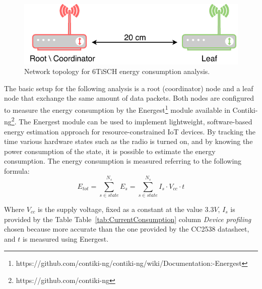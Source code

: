 \documentclass[conference]{IEEEtran}
\newcommand{\tabref}[1]{Table~\ref{#1}}
\renewcommand\_{\textunderscore\allowbreak}
\begin{document}
\begin{figure}[htbp]
	\centering
	\includegraphics[width=.35\textwidth,keepaspectratio]{figures/exp1Topology.pdf}
	\caption{Network topology for 6TiSCH energy consumption analysis.}
	\label{fig:exp1Topology}
\end{figure}
The basic setup for the following analysis is a root (coordinator) node and a leaf node that exchange the same amount of data packets.
Both nodes are configured to measure the energy consumption by the Energest\footnote{https://github.com/contiki-ng/contiki-ng/wiki/Documentation:-Energest} module available in Contiki-ng\footnote{https://github.com/contiki-ng}.
The Energest module can be used to implement lightweight, software-based energy estimation approach for resource-constrained IoT devices. By tracking the time various hardware states such as the radio is turned on, and by knowing the power consumption of the state, it is possible to estimate the energy consumption\cite{contiki-NGWiki}.
The energy consumption is measured referring to the following formula:
\begin{equation}
	E_{tot}=\sum_{s \in state}^{N_{s}}E_{s}=\sum_{s \in state}^{N_{s}}I_s  \cdot V_{cc} \cdot t
\end{equation}

Where $V_{cc}$ is the supply voltage, fixed as a constant at the value $3.3V$, $I_s$ is provided by the Table \tabref{tab:CurrentConsumption} column \textit{Device profiling}\cite{EnergyConsumption} chosen because more accurate than the one provided by the CC2538 datasheet, and $t$ is measured using Energest.
\end{document}
